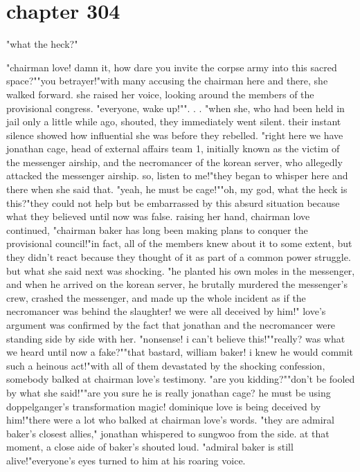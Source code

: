 \section{chapter 304}

"what the heck?"




"chairman love! damn it, how dare you invite the corpse army into this sacred space?""you betrayer!"with many accusing the chairman here and there, she walked forward.
 she raised her voice, looking around the members of the provisional congress.
"everyone, wake up!"".
.
.
"when she, who had been held in jail only a little while ago, shouted, they immediately went silent.
 their instant silence showed how influential she was before they rebelled.
 "right here we have jonathan cage, head of external affairs team 1, initially known as the victim of the messenger airship, and the necromancer of the korean server, who allegedly attacked the messenger airship.
 so, listen to me!"they began to whisper here and there when she said that.
 "yeah, he must be cage!""oh, my god, what the heck is this?"they could not help but be embarrassed by this absurd situation because what they believed until now was false.
raising her hand, chairman love continued, "chairman baker has long been making plans to conquer the provisional council!"in fact, all of the members knew about it to some extent, but they didn't react because they thought of it as part of a common power struggle.
 but what she said next was shocking.
"he planted his own moles in the messenger, and when he arrived on the korean server, he brutally murdered the messenger's crew, crashed the messenger, and made up the whole incident as if the necromancer was behind the slaughter! we were all deceived by him!"
love's argument was confirmed by the fact that jonathan and the necromancer were standing side by side with her.
"nonsense! i can't believe this!""really? was what we heard until now a fake?""that bastard, william baker! i knew he would commit such a heinous act!"with all of them devastated by the shocking confession, somebody balked at chairman love's testimony.
"are you kidding?""don't be fooled by what she said!""are you sure he is really jonathan cage? he must be using doppelganger's transformation magic! dominique love is being deceived by him!"there were a lot who balked at chairman love's words.
"they are admiral baker's closest allies," jonathan whispered to sungwoo from the side.
at that moment, a close aide of baker's shouted loud.
 "admiral baker is still alive!"everyone's eyes turned to him at his roaring voice.
